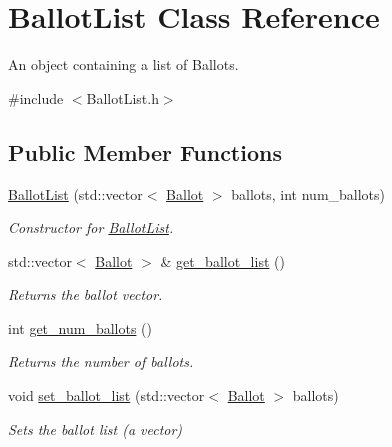 \hypertarget{class_ballot_list}{}\section{Ballot\+List Class Reference}
\label{class_ballot_list}


An object containing a list of Ballots.  




{\ttfamily \#include $<$Ballot\+List.\+h$>$}

\subsection*{Public Member Functions}
\begin{DoxyCompactItemize}
\item 
\mbox{\hyperlink{class_ballot_list_a0a28d688e8a0cd744f6d75080b4b0c3c}{Ballot\+List}} (std\+::vector$<$ \mbox{\hyperlink{class_ballot}{Ballot}} $>$ ballots, int num\+\_\+ballots)
\begin{DoxyCompactList}\small\item\em Constructor for \mbox{\hyperlink{class_ballot_list}{Ballot\+List}}. \end{DoxyCompactList}\item 
\mbox{\label{class_ballot_list_aab8721f12320262c4a314df4194f4fcf}} 
std\+::vector$<$ \mbox{\hyperlink{class_ballot}{Ballot}} $>$ \& \mbox{\hyperlink{class_ballot_list_aab8721f12320262c4a314df4194f4fcf}{get\+\_\+ballot\+\_\+list}} ()
\begin{DoxyCompactList}\small\item\em Returns the ballot vector. \end{DoxyCompactList}\item 
\mbox{\label{class_ballot_list_a8cc1453cabd26e0cf497fa5a943c8728}} 
int \mbox{\hyperlink{class_ballot_list_a8cc1453cabd26e0cf497fa5a943c8728}{get\+\_\+num\+\_\+ballots}} ()
\begin{DoxyCompactList}\small\item\em Returns the number of ballots. \end{DoxyCompactList}\item 
void \mbox{\hyperlink{class_ballot_list_aff8ea545ef67d60287aa543af731b331}{set\+\_\+ballot\+\_\+list}} (std\+::vector$<$ \mbox{\hyperlink{class_ballot}{Ballot}} $>$ ballots)
\begin{DoxyCompactList}\small\item\em Sets the ballot list (a vector) \end{DoxyCompactList}\item 

\end{DoxyCompactItemize}
